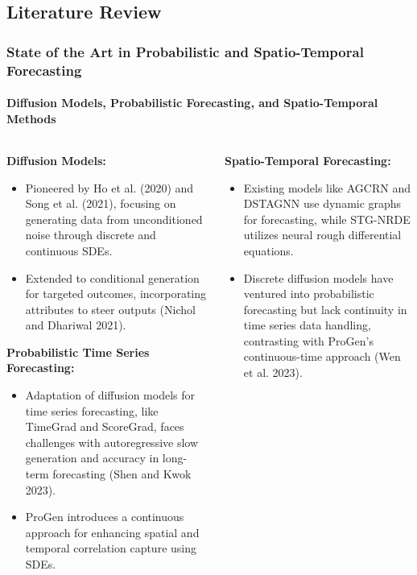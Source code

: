 \documentclass[light]{lutbeamer} %
\begin{document}
\subsection{Literature Review}
\begin{frame}
    \frametitle{State of the Art in Probabilistic and Spatio-Temporal Forecasting}
    \framesubtitle{Diffusion Models, Probabilistic Forecasting, and Spatio-Temporal Methods}

    \begin{columns}[T]
        \begin{column}{0.48\textwidth}
            \textbf{Diffusion Models:}
            \begin{itemize}
                \item Pioneered by Ho et al. (2020) and Song et al. (2021), focusing on generating data from unconditioned noise through discrete and continuous SDEs.
                \item Extended to conditional generation for targeted outcomes, incorporating attributes to steer outputs (Nichol and Dhariwal 2021).
            \end{itemize}

            \textbf{Probabilistic Time Series Forecasting:}
            \begin{itemize}
                \item Adaptation of diffusion models for time series forecasting, like TimeGrad and ScoreGrad, faces challenges with autoregressive slow generation and accuracy in long-term forecasting (Shen and Kwok 2023).
                \item ProGen introduces a continuous approach for enhancing spatial and temporal correlation capture using SDEs.
            \end{itemize}
        \end{column}

        \begin{column}{0.48\textwidth}
            \textbf{Spatio-Temporal Forecasting:}
            \begin{itemize}
                \item Existing models like AGCRN and DSTAGNN use dynamic graphs for forecasting, while STG-NRDE utilizes neural rough differential equations.
                \item Discrete diffusion models have ventured into probabilistic forecasting but lack continuity in time series data handling, contrasting with ProGen's continuous-time approach (Wen et al. 2023).
            \end{itemize}
        \end{column}
    \end{columns}
\end{frame}
\end{document}
